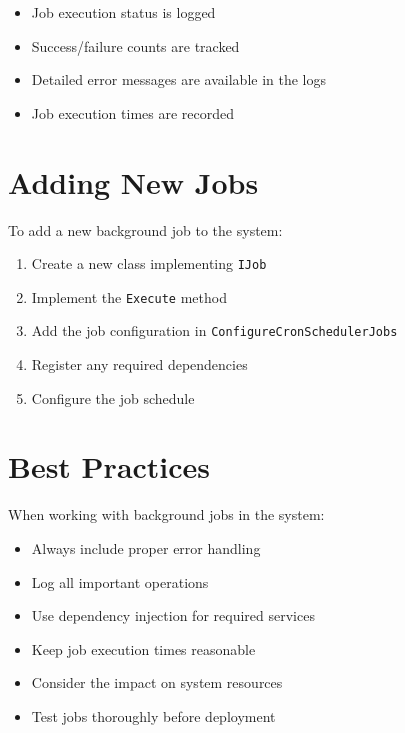 \begin{itemize}
    \item Job execution status is logged
    \item Success/failure counts are tracked
    \item Detailed error messages are available in the logs
    \item Job execution times are recorded
\end{itemize}

\section{Adding New Jobs}
To add a new background job to the system:

\begin{enumerate}
    \item Create a new class implementing \texttt{IJob}
    \item Implement the \texttt{Execute} method
    \item Add the job configuration in \texttt{ConfigureCronSchedulerJobs}
    \item Register any required dependencies
    \item Configure the job schedule
\end{enumerate}

\section{Best Practices}
When working with background jobs in the system:

\begin{itemize}
    \item Always include proper error handling
    \item Log all important operations
    \item Use dependency injection for required services
    \item Keep job execution times reasonable
    \item Consider the impact on system resources
    \item Test jobs thoroughly before deployment
\end{itemize} 